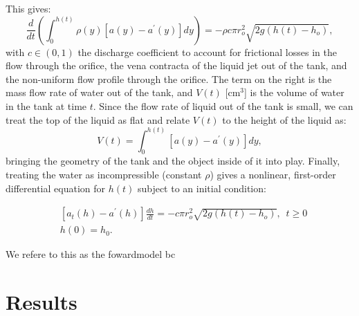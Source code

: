 \documentclass[openacc]{rsproca_new}%
\begin{document}
This gives:
\begin{equation}
	\frac{d}{dt} \left ( \int_0^{h(t)} \rho(y) [a(y) - a^\prime(y)]dy \right) = - \rho c \pi r_o^2 \sqrt{2 g(h(t)-h_o)},
\end{equation}
with $c\in(0,1)$ the discharge coefficient \cite{lienhard1984velocity,hicks2014determining,wadhwa2021study,teoman2022discharge} to account for frictional losses in the flow through the orifice, the vena contracta of the liquid jet out of the tank, and the non-uniform flow profile through the orifice. The term on the right is the mass flow rate of water out of the tank, and $V(t)$ [cm$^3$] is the volume of water in the tank at time $t$. 
Since the flow rate of liquid out of the tank is small, we can treat the top of the liquid as flat and relate $V(t)$ to the height of the liquid as: 
\begin{equation}
	V(t)=\int_0^{h(t)} [a(y) - a^\prime(y)]dy,
\end{equation}
bringing the geometry of the tank and the object inside of it into play. Finally, treating the water as incompressible (constant $\rho$) gives a nonlinear, first-order differential equation for $h(t)$ subject to an initial condition:

\begin{align}
& [a_t(h)-a^\prime(h)]\frac{dh}{dt}= -c \pi r_o^2 \sqrt{2g (h(t)-h_o)}, \,\,\, t \geq 0 \\
& h(0)=h_0.
\end{align}

We refere to this as the fowardmodel bc

\section{Results}
\end{document}

